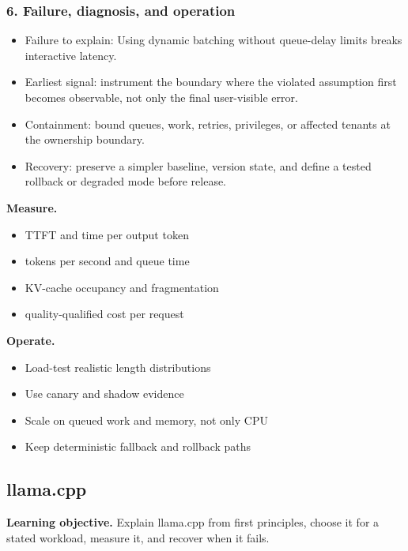 \subsubsection*{6. Failure, diagnosis, and operation}
\begin{itemize}
\item Failure to explain: Using dynamic batching without queue-delay limits breaks interactive latency.
\item Earliest signal: instrument the boundary where the violated assumption first becomes observable, not only the final user-visible error.
\item Containment: bound queues, work, retries, privileges, or affected tenants at the ownership boundary.
\item Recovery: preserve a simpler baseline, version state, and define a tested rollback or degraded mode before release.
\end{itemize}
\textbf{Measure.}\begin{itemize}
\item TTFT and time per output token
\item tokens per second and queue time
\item KV-cache occupancy and fragmentation
\item quality-qualified cost per request
\end{itemize}
\textbf{Operate.}\begin{itemize}
\item Load-test realistic length distributions
\item Use canary and shadow evidence
\item Scale on queued work and memory, not only CPU
\item Keep deterministic fallback and rollback paths
\end{itemize}
\subsection{llama.cpp}
\textbf{Learning objective.} Explain llama.cpp from first principles, choose it for a stated workload, measure it, and recover when it fails.
